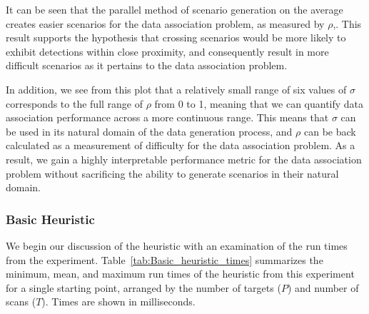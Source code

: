 It can be seen that the parallel method of scenario generation on the average creates easier scenarios for the data association problem, as measured by $\rho$,. This result supports the hypothesis that crossing scenarios would be more likely to exhibit detections within close proximity, and consequently result in more difficult scenarios as it pertains to the data association problem. 

In addition, we see from this plot that a relatively small range of six values of $\sigma$ corresponds to the full range of $\rho$ from 0 to 1, meaning that we can quantify data association performance across a more continuous range. This means that $\sigma$ can be used in its natural domain of the data generation process, and $\rho$ can be back calculated as a measurement of difficulty for the data association problem. As a result, we gain a highly interpretable performance metric for the data association problem without sacrificing the ability to generate scenarios in their natural domain. 

\subsubsection{Basic Heuristic}
We begin our discussion of the heuristic with an examination of the run times from the experiment. Table~\ref{tab:Basic_heuristic_times} summarizes the minimum, mean, and maximum run times of the heuristic from this experiment for a single starting point, arranged by the number of targets ($P$) and number of scans ($T$). Times are shown in milliseconds. 


